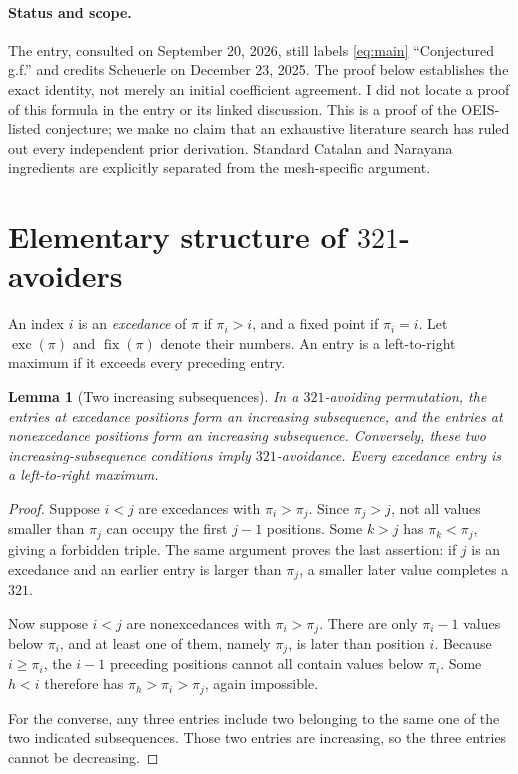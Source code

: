 \documentclass[11pt,letterpaper]{article}
\numberwithin{equation}{section}
\newtheorem{lemma}[theorem]{Lemma}
\theoremstyle{definition}
\DeclareMathOperator{\exc}{exc}
\DeclareMathOperator{\fix}{fix}
\begin{document}
\paragraph{Status and scope.}
The entry, consulted on September 20, 2026, still labels \eqref{eq:main}
``Conjectured g.f.'' and credits Scheuerle on December 23, 2025.
The proof below establishes the exact identity, not merely an initial
coefficient agreement. I did not locate a proof of this formula in the entry
or its linked discussion. This is a proof of the OEIS-listed conjecture;
we make no claim that an exhaustive literature search has ruled out every
independent prior derivation. Standard Catalan and Narayana ingredients
are explicitly separated from the mesh-specific argument.

\section{Elementary structure of \texorpdfstring{$321$}{321}-avoiders}
\label{sec:structure}

An index $i$ is an \emph{excedance} of $\pi$ if $\pi_i>i$, and a fixed
point if $\pi_i=i$. Let $\exc(\pi)$ and $\fix(\pi)$ denote their numbers.
An entry is a left-to-right maximum if it exceeds every preceding entry.

\begin{lemma}[Two increasing subsequences]
\label{lem:biinc}
In a $321$-avoiding permutation, the entries at excedance positions form
an increasing subsequence, and the entries at nonexcedance positions form
an increasing subsequence. Conversely, these two increasing-subsequence
conditions imply $321$-avoidance. Every excedance entry is a left-to-right
maximum.
\end{lemma}
\begin{proof}
Suppose $i<j$ are excedances with $\pi_i>\pi_j$. Since $\pi_j>j$, not all
values smaller than $\pi_j$ can occupy the first $j-1$ positions.
Some $k>j$ has $\pi_k<\pi_j$, giving a forbidden triple.
The same argument proves the last assertion: if $j$ is an excedance and
an earlier entry is larger than $\pi_j$, a smaller later value completes
a $321$.

Now suppose $i<j$ are nonexcedances with $\pi_i>\pi_j$. There are only
$\pi_i-1$ values below $\pi_i$, and at least one of them, namely $\pi_j$,
is later than position $i$. Because $i\ge\pi_i$, the $i-1$ preceding
positions cannot all contain values below $\pi_i$. Some $h<i$ therefore
has $\pi_h>\pi_i>\pi_j$, again impossible.

For the converse, any three entries include two belonging to the same
one of the two indicated subsequences. Those two entries are increasing,
so the three entries cannot be decreasing.
\end{proof}
\end{document}
